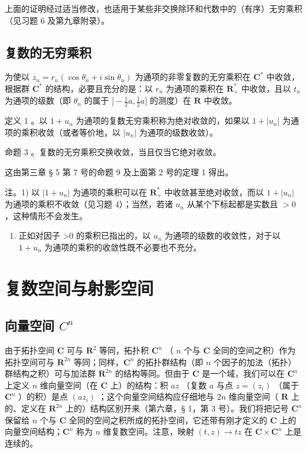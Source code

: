 上面的证明经过适当修改，也适用于某些非交换除环和代数中的（有序）无穷乘积（见习题 6 及第九章附录）。

\subsection{复数的无穷乘积}

为使以 \(z_{n} = r_{n}(\cos \theta_{n} + i\sin \theta_{n})\) 为通项的非零复数的无穷乘积在 \(\mathbf{C}^{*}\) 中收敛，根据群 \(\mathbf{C}^{*}\) 的结构，必要且充分的是：以 \(r_{n}\) 为通项的乘积在 \(\mathbf{R}_{+}^{*}\) 中收敛，且以 \(t_{n}\) 为通项的级数（即 \(\theta_{n}\) 的属于 \(] - \frac{1}{2} a, \frac{1}{2} a]\) 的测度）在 \(\mathbf{R}\) 中收敛。

定义 1 。以 \(1 + u_{n}\) 为通项的复数无穷乘积称为绝对收敛的，如果以 \(1 + |u_{n}|\) 为通项的乘积收敛（或者等价地，以 \(|u_{n}|\) 为通项的级数收敛）。

命题 3 。复数的无穷乘积交换收敛，当且仅当它绝对收敛。

这由第三章 § 5 第 7 号的命题 9 及上面第 2 号的定理 1 得出。

注。1) 以 \(|1 + u_n|\) 为通项的乘积可以在 \(\mathbf{R}_+^*\) 中收敛甚至绝对收敛，而以 \(1 + |u_n|\) 为通项的乘积不收敛（见习题 4）；当然，若诸 \(u_n\) 从某个下标起都是实数且 \(>0\) ，这种情形不会发生。

\begin{enumerate}
\def\labelenumi{\arabic{enumi})}
\setcounter{enumi}{1}
\tightlist
\item
  正如对因子 \textgreater0 的乘积已指出的，以 \(u_{n}\) 为通项的级数的收敛性，对于以 \(1 + u_{n}\) 为通项的乘积的收敛性既不必要也不充分。
\end{enumerate}

\section{复数空间与射影空间}

\subsection{\texorpdfstring{向量空间 \(C^{n}\)}{向量空间 C 的 n 次幂}}

由于拓扑空间 \(\mathbf{C}\) 可与 \(\mathbf{R}^2\) 等同，拓扑积 \(\mathbf{C}^n\) （ \(n\) 个与 \(\mathbf{C}\) 全同的空间之积）作为拓扑空间可与 \(\mathbf{R}^{2n}\) 等同；同样，\(\mathbf{C}^n\) 的拓扑群结构（即 \(n\) 个因子的加法（拓扑）群结构之积）可与加法群 \(\mathbf{R}^{2n}\) 的结构等同。但由于 \(\mathbf{C}\) 是一个域，我们可以在 \(\mathbf{C}^n\) 上定义 \(n\) 维向量空间（在 \(\mathbf{C}\) 上）的结构：积 \(az\) （复数 \(a\) 与点 \(z = (z_i)\) （属于 \(\mathbf{C}^n\) ）的积）是点 \((az_i)\) ；这个向量空间结构应仔细地与 \(2n\) 维向量空间（ \(\mathbf{R}\) 上的、定义在 \(\mathbf{R}^{2n}\) 上的）结构区别开来（第六章，§ 1，第 3 号）。我们将把记号 \(\mathbf{C}^n\) 保留给 \(n\) 个与 \(\mathbf{C}\) 全同的空间之积所成的拓扑空间，它还带有刚才定义的 \(\mathbf{C}\) 上的向量空间结构；\(\mathbf{C}^n\) 称为 \(n\) 维复数空间。注意，映射 \((t, z) \to tz\) 在 \(\mathbf{C} \times \mathbf{C}^n\) 上是连续的。

